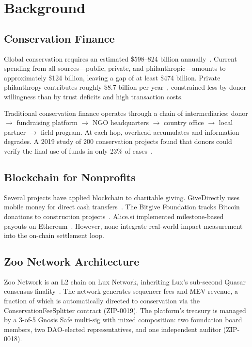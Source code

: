 \documentclass[11pt,letterpaper]{article}
\begin{document}
\section{Background}

\subsection{Conservation Finance}

Global conservation requires an estimated \$598--824 billion annually~\cite{paulson2020}. Current spending from all sources---public, private, and philanthropic---amounts to approximately \$124 billion, leaving a gap of at least \$474 billion. Private philanthropy contributes roughly \$8.7 billion per year~\cite{oecd2020}, constrained less by donor willingness than by trust deficits and high transaction costs.

Traditional conservation finance operates through a chain of intermediaries: donor $\to$ fundraising platform $\to$ NGO headquarters $\to$ country office $\to$ local partner $\to$ field program. At each hop, overhead accumulates and information degrades. A 2019 study of 200 conservation projects found that donors could verify the final use of funds in only 23\% of cases~\cite{waldron2019}.

\subsection{Blockchain for Nonprofits}

Several projects have applied blockchain to charitable giving. GiveDirectly uses mobile money for direct cash transfers~\cite{givedirectly2022}. The Bitgive Foundation tracks Bitcoin donations to construction projects~\cite{bitgive2018}. Alice.si implemented milestone-based payouts on Ethereum~\cite{alice2019}. However, none integrate real-world impact measurement into the on-chain settlement loop.

\subsection{Zoo Network Architecture}

Zoo Network is an L2 chain on Lux Network, inheriting Lux's sub-second Quasar consensus finality~\cite{zooarch2024}. The network generates sequencer fees and MEV revenue, a fraction of which is automatically directed to conservation via the ConservationFeeSplitter contract (ZIP-0019). The platform's treasury is managed by a 3-of-5 Gnosis Safe multi-sig with mixed composition: two foundation board members, two DAO-elected representatives, and one independent auditor (ZIP-0018).
\end{document}
